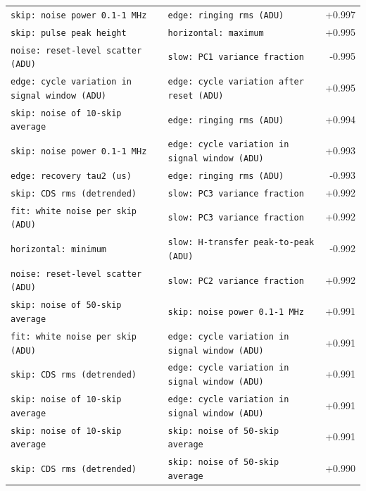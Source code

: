 \documentclass[10pt]{article}
\begin{document}
\begin{longtable}{>{\raggedright\arraybackslash}p{}>{\raggedright\arraybackslash}p{}r}
\texttt{skip: noise power 0.1-1 MHz} & \texttt{edge: ringing rms (ADU)} & +0.997 \\
\texttt{skip: pulse peak height} & \texttt{horizontal: maximum} & +0.995 \\
\texttt{noise: reset-level scatter (ADU)} & \texttt{slow: PC1 variance fraction} & -0.995 \\
\texttt{edge: cycle variation in signal window (ADU)} & \texttt{edge: cycle variation after reset (ADU)} & +0.995 \\
\texttt{skip: noise of 10-skip average} & \texttt{edge: ringing rms (ADU)} & +0.994 \\
\texttt{skip: noise power 0.1-1 MHz} & \texttt{edge: cycle variation in signal window (ADU)} & +0.993 \\
\texttt{edge: recovery tau2 (us)} & \texttt{edge: ringing rms (ADU)} & -0.993 \\
\texttt{skip: CDS rms (detrended)} & \texttt{slow: PC3 variance fraction} & +0.992 \\
\texttt{fit: white noise per skip (ADU)} & \texttt{slow: PC3 variance fraction} & +0.992 \\
\texttt{horizontal: minimum} & \texttt{slow: H-transfer peak-to-peak (ADU)} & -0.992 \\
\texttt{noise: reset-level scatter (ADU)} & \texttt{slow: PC2 variance fraction} & +0.992 \\
\texttt{skip: noise of 50-skip average} & \texttt{skip: noise power 0.1-1 MHz} & +0.991 \\
\texttt{fit: white noise per skip (ADU)} & \texttt{edge: cycle variation in signal window (ADU)} & +0.991 \\
\texttt{skip: CDS rms (detrended)} & \texttt{edge: cycle variation in signal window (ADU)} & +0.991 \\
\texttt{skip: noise of 10-skip average} & \texttt{edge: cycle variation in signal window (ADU)} & +0.991 \\
\texttt{skip: noise of 10-skip average} & \texttt{skip: noise of 50-skip average} & +0.991 \\
\texttt{skip: CDS rms (detrended)} & \texttt{skip: noise of 50-skip average} & +0.990 \\
\end{longtable}
\end{document}
